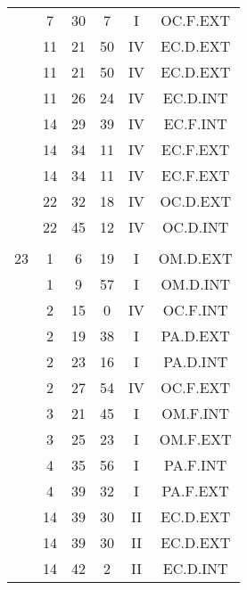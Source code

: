 \documentclass[12pt, a4paper]{article}
\begin{document}
\begin{multicols}{3}
{\begin{tabular}{c c c c c c}
	 	 	 	 & 7 & 30 & 7 & I & OC.F.EXT\\%
	 	 	 	 & 11 & 21 & 50 & IV & EC.D.EXT\\%
	 	 	 	 & 11 & 21 & 50 & IV & EC.D.EXT\\%
	 	 	 	 & 11 & 26 & 24 & IV & EC.D.INT\\%
	 	 	 	 & 14 & 29 & 39 & IV & EC.F.INT\\%
	 	 	 	 & 14 & 34 & 11 & IV & EC.F.EXT\\%
	 	 	 	 & 14 & 34 & 11 & IV & EC.F.EXT\\%
	 	 	 	 & 22 & 32 & 18 & IV & OC.D.EXT\\%
	 	 	 	 & 22 & 45 & 12 & IV & OC.D.INT\\%
	 	 	 	 & & & & & \\%
	 	 	 	23 & 1 & 6 & 19 & I & OM.D.EXT\\%
	 	 	 	 & 1 & 9 & 57 & I & OM.D.INT\\%
	 	 	 	 & 2 & 15 & 0 & IV & OC.F.INT\\%
	 	 	 	 & 2 & 19 & 38 & I & PA.D.EXT\\%
	 	 	 	 & 2 & 23 & 16 & I & PA.D.INT\\%
	 	 	 	 & 2 & 27 & 54 & IV & OC.F.EXT\\%
	 	 	 	 & 3 & 21 & 45 & I & OM.F.INT\\%
	 	 	 	 & 3 & 25 & 23 & I & OM.F.EXT\\%
	 	 	 	 & 4 & 35 & 56 & I & PA.F.INT\\%
	 	 	 	 & 4 & 39 & 32 & I & PA.F.EXT\\%
	 	 	 	 & 14 & 39 & 30 & II & EC.D.EXT\\%
	 	 	 	 & 14 & 39 & 30 & II & EC.D.EXT\\%
	 	 	 	 & 14 & 42 & 2 & II & EC.D.INT\\%
	 	 \end{tabular}
 	}
\end{multicols}
\end{document}
